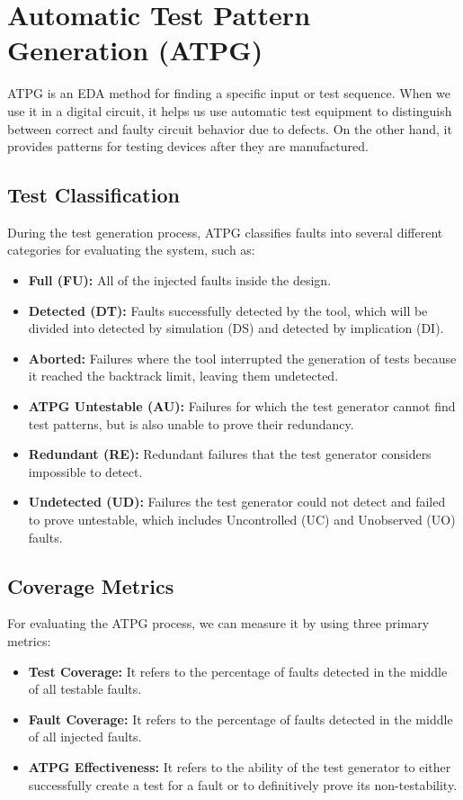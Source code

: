 \documentclass[12pt, a4paper]{article}
\begin{document}
\newpage
\section{Automatic Test Pattern Generation (ATPG)}
ATPG is an EDA method for finding a specific input or test sequence. When we use it in a digital circuit, it helps us use automatic test equipment to distinguish between correct and faulty circuit behavior due to defects. On the other hand, it provides patterns for testing devices after they are manufactured.
\subsection{Test Classification}
During the test generation process, ATPG classifies faults into several different categories for evaluating the system, such as:
\begin{itemize}
  \item \textbf{Full (FU):} All of the injected faults inside the design.
  \item \textbf{Detected (DT):} Faults successfully detected by the tool, which will be divided into detected by simulation (DS) and detected by implication (DI).
  \item \textbf{Aborted:} Failures where the tool interrupted the generation of tests because it reached the backtrack limit, leaving them undetected.
  \item \textbf{ATPG Untestable (AU):} Failures for which the test generator cannot find test patterns, but is also unable to prove their redundancy.
  \item \textbf{Redundant (RE):} Redundant failures that the test generator considers impossible to detect.
  \item \textbf{Undetected (UD):} Failures the test generator could not detect and failed to prove untestable, which includes Uncontrolled (UC) and Unobserved (UO) faults.
\end{itemize}
\subsection{Coverage Metrics}
For evaluating the ATPG process, we can measure it by using three primary metrics:
\begin{itemize}
  \item \textbf{Test Coverage:} It refers to the percentage of faults detected in the middle of all testable faults.
  \item \textbf{Fault Coverage:} It refers to the percentage of faults detected in the middle of all injected faults.
  \item \textbf{ATPG Effectiveness:} It refers to the ability of the test generator to either successfully create a test for a fault or to definitively prove its non-testability.
  \end{itemize}
\end{document}
